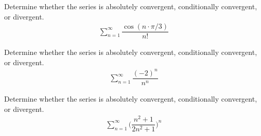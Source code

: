 \begin{exercise}
Determine whether the series is absolutely convergent, conditionally convergent, or divergent.
\begin{align*}
    \sum_{n=1}^{\infty} \dfrac{\cos(n\cdot\pi/3)}{n!}
\end{align*}
\end{exercise}

\begin{exercise}
Determine whether the series is absolutely convergent, conditionally convergent, or divergent.
\begin{align*}
    \sum_{n=1}^{\infty} \dfrac{(-2)^{n}}{n^{n}}
\end{align*}
\end{exercise}

\begin{exercise}
Determine whether the series is absolutely convergent, conditionally convergent, or divergent.
\begin{align*}
    \sum_{n=1}^{\infty} \Big(\dfrac{n^{2} + 1}{2n^{2} + 1}\Big)^{n}
\end{align*}
\end{exercise}